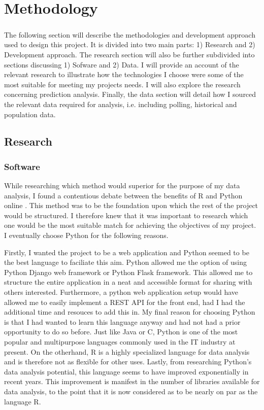 \chapter{Methodology}
\paragraph{}
The following section will describe the methodologies and development approach used to
design this project. It is divided into two main parts: 1) Research and 2) Development approach. The research section will also be further subdivided into sections discussing 1) Sofware and 2) Data. I will provide an account of the relevant research to illustrate how the technologies I choose were some of the most suitable for meeting my projects needs. I will also explore the research
concerning prediction analysis. Finally, the data section will detail how I sourced the
relevant data required for analysis, i.e. including polling, historical and population data.

\section{Research}
\subsection{Software}
While researching which method would superior for the purpose of my data analysis, I found a contentious debate between the benefits of R and Python online \cite{debate}. This method was to be the foundation upon which the rest of the project would be structured.  I therefore knew that it was important to research which one would be the most suitable match for achieving the objectives of my project. I eventually choose Python for the following reasons.

Firstly, I wanted the project to be a web application and Python seemed to be the best language to faciliate this aim. Python allowed me the option of using Python Django web framework or Python Flask framework. This allowed me to structure the entire application in a neat and accessible format for sharing with others interested. Furthermore, a python web application setup would have allowed me to easily implement a REST API for the front end, had I had the additional time and resouces to add this in. My final reason for choosing Python is that I had wanted to learn this language anyway and had not had a prior opportunity to do so before. Just like Java or C, Python is one of the most popular and multipurpose languages commonly used in the IT industry at present. On the otherhand, R is a highly specialized language for data analysis and is therefore not as flexible for other uses. Lastly, from researching Python’s data analysis potential, this language seems to have improved exponentially in recent years. This improvement is manifest in the number of libraries available for data analysis, to the point that it is now considered as to be nearly on par as the language R.

